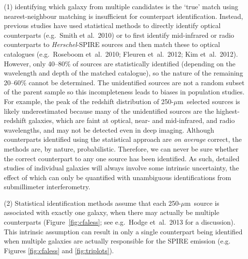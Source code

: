 \documentclass[12pt,a4paper]{article}
\newcommand{\herschel}{{\it Herschel}}
\newcommand{\ea}{et~al.}
\newcommand{\micron}{$\mu$m}
\begin{document}
\noindent\begin{minipage}{0.58\textwidth}

\hspace{0.2cm}
(1) identifying which galaxy from multiple candidates is the `true' match using nearest-neighbour
matching is insufficient for counterpart identification. Instead,
previous studies have used statistical methods to directly identify
optical counterparts (e.g.\ Smith et al.\ 2010) or to first identify
mid-infrared or radio counterparts to \herschel-SPIRE sources and then match
these to optical catalogues (e.g.\ Roseboom \ea\ 2010; Fleuren \ea\
2012; Kim \ea\ 2012). However, only 40--80\% of sources are statistically identified (depending
on the wavelength and depth of the matched catalogue), so the nature
of the remaining 20--60\% cannot be determined. The unidentified
sources are not a random subset of the parent sample so this
incompleteness leads to biases in population studies. For example, the
peak of the redshift distribution of 250-\micron\ selected sources is
likely underestimated because many of the unidentified sources are the
highest-redshift galaxies, which are faint at optical, near- and
mid-infrared, and radio wavelengths, and may not be detected
even in deep imaging. Although counterparts identified using the statistical approach are {\it on
  average} correct, the methods are, by nature,
probabilistic. Therefore, we can never be sure whether the correct
counterpart to any one source has been identified. As such,
detailed studies of individual galaxies will always involve some intrinsic
uncertainty, the effect of which can only be quantified with
unambiguous identifications from submillimeter interferometry.

(2) Statistical identification methods assume that each 250-\micron\
source is associated with exactly one galaxy, when there may actually
be multiple counterparts (Figure~\ref{fig:cfaless}; see e.g.\ Hodge \ea\ 2013 for a
discussion). This intrinsic assumption can result in only a single
counterpart being identified when multiple galaxies are actually
responsible for the SPIRE emission (e.g. Figures \ref{fig:cfaless} and \ref{fig:triplots}).
\end{minipage}
\end{document}
